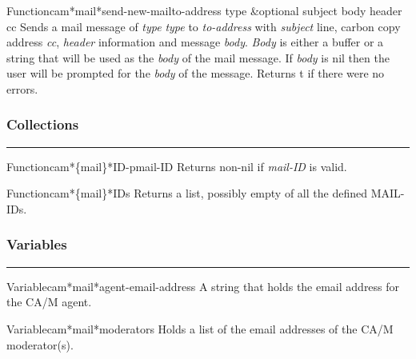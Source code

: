 \begin{functiondoc}{Function}{cam*mail*send-new-mail}{to-address type \&optional subject body header cc}
Sends a mail message of {\em type} {\em type} to {\em to-address} with {\em subject} line, carbon copy 
address {\em cc}, {\em header} information and message {\em body}.  {\em Body} is either a buffer or a 
string that will be used as the {\em body} of the mail message. If {\em body} is nil then the 
user will be prompted for the {\em body} of the message. Returns t if there were no errors.
\end{functiondoc}


\subsubsection*{Collections}
\par\vspace*{0.00in}\par\hrule\par\medskip\par


\begin{functiondoc}{Function}{cam*\{mail\}*ID-p}{mail-ID}
Returns non-nil if {\em mail-ID} is valid.
\end{functiondoc}

\begin{functiondoc}{Function}{cam*\{mail\}*IDs}{}
Returns a list, possibly empty of all the defined MAIL-IDs.
\end{functiondoc}


\subsubsection*{Variables}
\par\vspace*{0.00in}\par\hrule\par\medskip\par


\begin{functiondoc}{Variable}{cam*mail*agent-email-address}{}
A string that holds the email address for the CA/M agent.
\end{functiondoc}

\begin{functiondoc}{Variable}{cam*mail*moderators}{}
Holds a list of the email addresses of the CA/M moderator(s).
\end{functiondoc}

